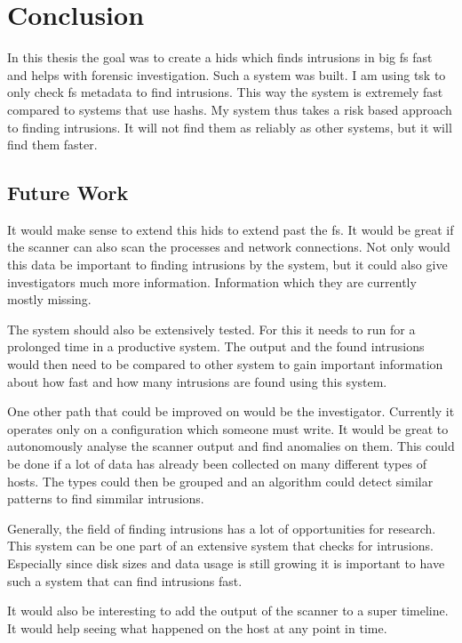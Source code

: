 
\chapter{Conclusion}
\label{sec:Conclusion}

In this thesis the goal was to create a \gls{hids} which finds intrusions in big \gls{fs} fast and helps with forensic investigation. Such a system was built. I am using \gls{tsk} to only check \gls{fs} \gls{metadata} to find intrusions. This way the system is extremely fast compared to systems that use \glspl{hash}. My system thus takes a risk based approach to finding intrusions. It will not find them as reliably as other systems, but it will find them faster. 

\section{Future Work}
\label{sec:future:work}

It would make sense to extend this \gls{hids} to extend past the \gls{fs}. It would be great if the scanner can also scan the processes and network connections. Not only would this data be important to finding intrusions by the system, but it could also give investigators much more information. Information which they are currently mostly missing.

The system should also be extensively tested. For this it needs to run for a prolonged time in a productive system. The output and the found intrusions would then need to be compared to other system to gain important information about how fast and how many intrusions are found using this system. 

One other path that could be improved on would be the investigator. Currently it operates only on a configuration which someone must write. It would be great to autonomously analyse the scanner output and find anomalies on them. This could be done if a lot of data has already been collected on many different types of hosts. The types could then be grouped and an algorithm could detect similar patterns to find simmilar intrusions. 

Generally, the field of finding intrusions has a lot of opportunities for research. This system can be one part of an extensive system that checks for intrusions. Especially since disk sizes and data usage is still growing it is important to have such a system that can find intrusions fast.

It would also be interesting to add the output of the scanner to a super timeline. It would help seeing what happened on the host at any point in time. 

